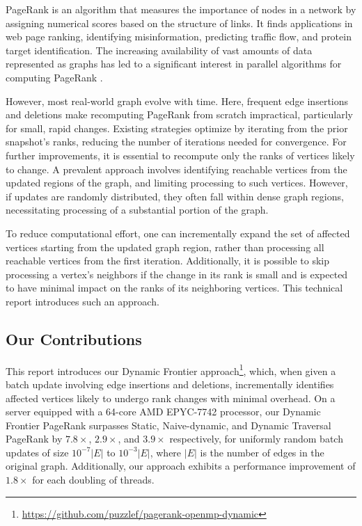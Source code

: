 PageRank \cite{rank-page99} is an algorithm that measures the importance of nodes in a network by assigning numerical scores based on the structure of links. It finds applications in web page ranking, identifying misinformation, predicting traffic flow, and protein target identification. The increasing availability of vast amounts of data represented as graphs has led to a significant interest in parallel algorithms for computing PageRank \cite{rank-garg16, rank-nvgraph, rank-giri20, rank-sarma13}.

However, most real-world graph evolve with time. Here, frequent edge insertions and deletions make recomputing PageRank from scratch impractical, particularly for small, rapid changes. Existing strategies optimize by iterating from the prior snapshot's ranks, reducing the number of iterations needed for convergence. For further improvements, it is essential to recompute only the ranks of vertices likely to change. A prevalent approach involves identifying reachable vertices from the updated regions of the graph, and limiting processing to such vertices. However, if updates are randomly distributed, they often fall within dense graph regions, necessitating processing of a substantial portion of the graph.

To reduce computational effort, one can incrementally expand the set of affected vertices starting from the updated graph region, rather than processing all reachable vertices from the first iteration. Additionally, it is possible to skip processing a vertex's neighbors if the change in its rank is small and is expected to have minimal impact on the ranks of its neighboring vertices. This technical report introduces such an approach.




\subsection{Our Contributions}

This report introduces our Dynamic Frontier approach\footnote{\url{https://github.com/puzzlef/pagerank-openmp-dynamic}}, which, when given a batch update involving edge insertions and deletions, incrementally identifies affected vertices likely to undergo rank changes with minimal overhead. On a server equipped with a 64-core AMD EPYC-7742 processor, our Dynamic Frontier PageRank surpasses Static, Naive-dynamic, and Dynamic Traversal PageRank by $7.8\times$, $2.9\times$, and $3.9\times$ respectively, for uniformly random batch updates of size $10^{-7}|E|$ to $10^{-3}|E|$, where $|E|$ is the number of edges in the original graph. Additionally, our approach exhibits a performance improvement of $1.8\times$ for each doubling of threads.




